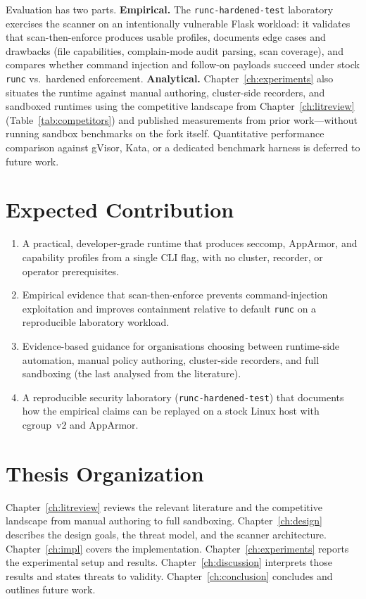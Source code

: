 Evaluation has two parts. \textbf{Empirical.} The \texttt{runc-hardened-test} laboratory exercises the scanner on an intentionally vulnerable Flask workload: it validates that scan-then-enforce produces usable profiles, documents edge cases and drawbacks (file capabilities, complain-mode audit parsing, scan coverage), and compares whether command injection and follow-on payloads succeed under stock \texttt{runc} vs.\ hardened enforcement. \textbf{Analytical.} Chapter~\ref{ch:experiments} also situates the runtime against manual authoring, cluster-side recorders, and sandboxed runtimes using the competitive landscape from Chapter~\ref{ch:litreview} (Table~\ref{tab:competitors}) and published measurements from prior work---without running sandbox benchmarks on the fork itself. Quantitative performance comparison against gVisor, Kata, or a dedicated benchmark harness is deferred to future work.

\section{Expected Contribution}

\begin{enumerate}
    \item A practical, developer-grade runtime that produces seccomp, AppArmor, and capability profiles from a single CLI flag, with no cluster, recorder, or operator prerequisites.
    \item Empirical evidence that scan-then-enforce prevents command-injection exploitation and improves containment relative to default \texttt{runc} on a reproducible laboratory workload.
    \item Evidence-based guidance for organisations choosing between runtime-side automation, manual policy authoring, cluster-side recorders, and full sandboxing (the last analysed from the literature).
    \item A reproducible security laboratory (\texttt{runc-hardened-test}) that documents how the empirical claims can be replayed on a stock Linux host with cgroup~v2 and AppArmor.
\end{enumerate}

\section{Thesis Organization}

Chapter~\ref{ch:litreview} reviews the relevant literature and the competitive landscape from manual authoring to full sandboxing. Chapter~\ref{ch:design} describes the design goals, the threat model, and the scanner architecture. Chapter~\ref{ch:impl} covers the implementation. Chapter~\ref{ch:experiments} reports the experimental setup and results. Chapter~\ref{ch:discussion} interprets those results and states threats to validity. Chapter~\ref{ch:conclusion} concludes and outlines future work.
